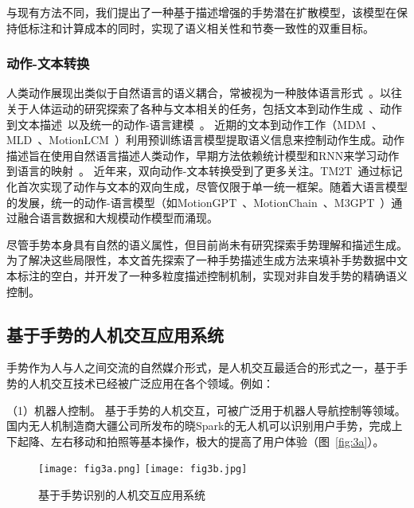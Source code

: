 与现有方法不同，我们提出了一种基于描述增强的手势潜在扩散模型，该模型在保持低标注和计算成本的同时，实现了语义相关性和节奏一致性的双重目标。

\subsubsection{动作-文本转换}
人类动作展现出类似于自然语言的语义耦合，常被视为一种肢体语言形式~\cite{jiang2024motiongpt}。以往关于人体运动的研究探索了各种与文本相关的任务，包括文本到动作生成~\cite{tevet2022mdm,guo2022humanml3d}、动作到文本描述~\cite{jiang2024motiongpt,guo2022tm2t}以及统一的动作-语言建模~\cite{tevet2022motionclip,jiang2024motiongpt,jiang2024motionchain}。
近期的文本到动作工作（MDM~\cite{tevet2022mdm}、MLD~\cite{chen2023executing}、MotionLCM~\cite{dai2024motionlcm}）利用预训练语言模型提取语义信息来控制动作生成。动作描述旨在使用自然语言描述人类动作，早期方法依赖统计模型和RNN来学习动作到语言的映射~\cite{takano2015statistical, yamada2018paired}。
近年来，双向动作-文本转换受到了更多关注。TM2T~\cite{guo2022tm2t}通过标记化首次实现了动作与文本的双向生成，尽管仅限于单一统一框架。随着大语言模型的发展，统一的动作-语言模型（如MotionGPT~\cite{jiang2024motiongpt}、MotionChain~\cite{jiang2024motionchain}、M3GPT~\cite{luo2024m}）通过融合语言数据和大规模动作模型而涌现。

尽管手势本身具有自然的语义属性，但目前尚未有研究探索手势理解和描述生成。
为了解决这些局限性，本文首先探索了一种手势描述生成方法来填补手势数据中文本标注的空白，并开发了一种多粒度描述控制机制，实现对非自发手势的精确语义控制。



\subsection{基于手势的人机交互应用系统}
手势作为人与人之间交流的自然媒介形式，是人机交互最适合的形式之一\cite{oudah2020hand}，基于手势的人机交互技术已经被广泛应用在各个领域。例如：

（1）机器人控制。 基于手势的人机交互，可被广泛用于机器人导航控制等领域\cite{al20223d}。国内无人机制造商大疆公司所发布的晓Spark的无人机可以识别用户手势，完成上下起降、左右移动和拍照等基本操作，极大的提高了用户体验（图~\ref{fig:3a}）。

\begin{figure}
  \centering
    {\texttt{[image: fig3a.png]}}
    {\texttt{[image: fig3b.jpg]}}
  \caption{基于手势识别的人机交互应用系统}
  \label{fig:HCI_system}
\end{figure}

